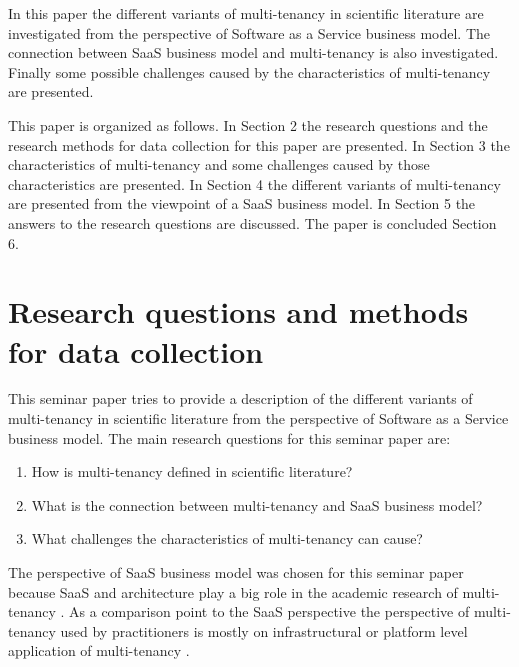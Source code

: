 \documentclass[conference]{sasmoota2017}
\begin{document}
In this paper the different variants of multi-tenancy in scientific literature are investigated from the perspective of Software as a Service business model. The connection between SaaS business model and multi-tenancy is also investigated. Finally some possible challenges caused by the characteristics of multi-tenancy are presented.

This paper is organized as follows. In Section 2 the research questions and the research methods for data collection for this paper are presented. In Section 3 the characteristics of multi-tenancy and some challenges caused by those characteristics are presented. In Section 4 the different variants of multi-tenancy are presented from the viewpoint of a SaaS business model. In Section 5 the answers to the research questions are discussed. The paper is concluded Section 6. 








\section{Research questions and methods for data collection}

This seminar paper tries to provide a description of the different variants of multi-tenancy in scientific literature from the perspective of Software as a Service business model. The main research questions for this seminar paper are: 
\begin{enumerate}
\item How is multi-tenancy defined in scientific literature?
\item What is the connection between multi-tenancy and SaaS business model?
\item What challenges the characteristics of multi-tenancy can cause?
\end{enumerate}
The perspective of SaaS business model was chosen for this seminar paper because SaaS and architecture play a big role in the academic research of multi-tenancy \cite{Kabbedijk2015:Defining}. As a comparison point to the SaaS perspective the perspective of multi-tenancy used by practitioners is mostly on infrastructural or platform level application of multi-tenancy \cite{Kabbedijk2015:Defining}. 
\end{document}

